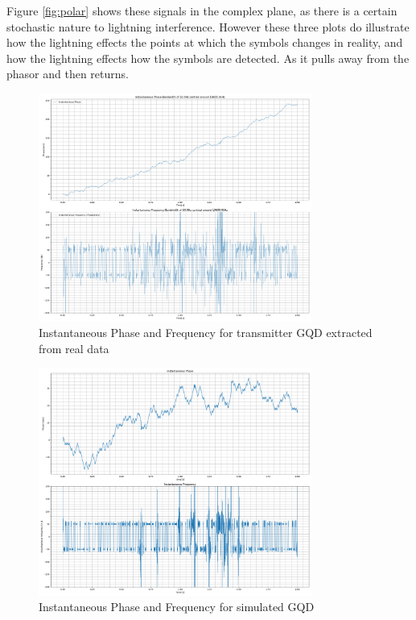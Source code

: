 Figure \ref{fig:polar} shows these signals in the complex plane, as there is a certain stochastic nature to lightning interference. However these three plots do illustrate how the lightning effects the points at which the symbols changes in reality, and how the lightning effects how the symbols are detected. As it pulls away from the phasor and then returns.


\begin{figure}[h!]
    \centering
    \includegraphics[width=0.8\textwidth]{figs/sim/veri/GQDver.png}
    \caption{\centering Instantaneous Phase and Frequency for transmitter GQD extracted from real data}
    \label{fig:AnthornDemod}
\end{figure}
\begin{figure}[h!]
    \centering
    \includegraphics[width = 0.8\textwidth]{figs/sim/veri/GQDfreq.png}
    \caption{\centering Instantaneous Phase and Frequency for simulated GQD}
    \label{fig:fullsimDemod}
\end{figure}
